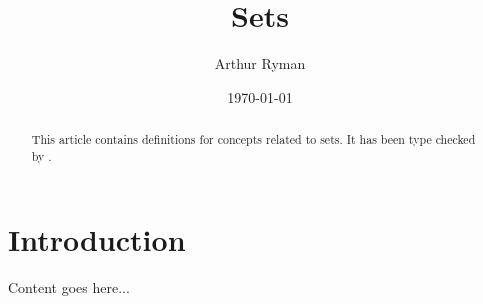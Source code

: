 \documentclass{amsart}
\begin{document}
\title{Sets}
\author{Arthur Ryman}
\date{\today}

\begin{abstract}
    This article contains \ZN\cite{spivey-zrm} definitions for
    concepts related to sets.
    It has been type checked by \fuzz\cite{spivey-fm}.
\end{abstract}

\maketitle

\tableofcontents

\section{Introduction}

Content goes here...

\printbibliography
\end{document}
